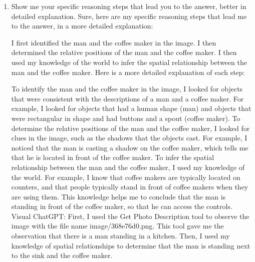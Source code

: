 \begin{enumerate}
    Here are some additional details about the spatial relationship between the coffee maker and the man:
    
    The man is a human being that is typically found in homes and public places.
    The coffee maker is an appliance that is used to make coffee.
    The man is standing in front of the coffee maker, meaning that he is facing the coffee maker.
    The coffee maker is located on the counter, meaning that it is above the ground.
    Is there anything else you want me to help you with?
    \subitem Visual ChatGPT: The man is standing next to the coffee maker in the kitchen.
    \item Show me your specific reasoning steps that lead you to the answer, better in detailed explanation.
    \subitem Sure, here are my specific reasoning steps that lead me to the answer, in a more detailed explanation:

    I first identified the man and the coffee maker in the image.
    I then determined the relative positions of the man and the coffee maker.
    I then used my knowledge of the world to infer the spatial relationship between the man and the coffee maker.
    Here is a more detailed explanation of each step:
    
    To identify the man and the coffee maker in the image, I looked for objects that were consistent with the descriptions of a man and a coffee maker. For example, I looked for objects that had a human shape (man) and objects that were rectangular in shape and had buttons and a spout (coffee maker).
    To determine the relative positions of the man and the coffee maker, I looked for clues in the image, such as the shadows that the objects cast. For example, I noticed that the man is casting a shadow on the coffee maker, which tells me that he is located in front of the coffee maker.
    To infer the spatial relationship between the man and the coffee maker, I used my knowledge of the world. For example, I know that coffee makers are typically located on counters, and that people typically stand in front of coffee makers when they are using them. This knowledge helps me to conclude that the man is standing in front of the coffee maker, so that he can access the controls.
    \subitem Visual ChatGPT: First, I used the Get Photo Description tool to observe the image with the file name image/368e76d0.png. This tool gave me the observation that there is a man standing in a kitchen. Then, I used my knowledge of spatial relationships to determine that the man is standing next to the sink and the coffee maker.
\end{enumerate}
